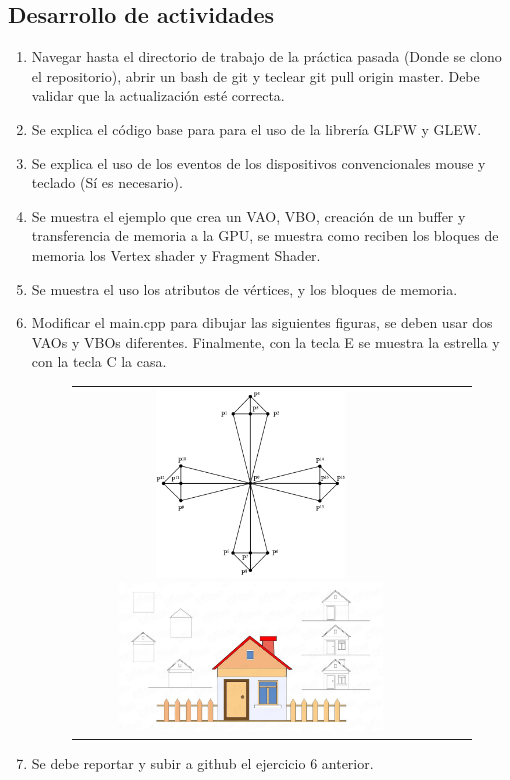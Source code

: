 \documentclass[11pt, english]{article}
\begin{document}
\subsection{Desarrollo de actividades}
\begin{enumerate}
\item Navegar hasta el directorio de trabajo de la práctica pasada (Donde se clono el
repositorio), abrir un bash de git y teclear git pull origin master. Debe validar que
la actualización esté correcta.
\item Se explica el código base para para el uso de la librería GLFW y GLEW.
\item Se explica el uso de los eventos de los dispositivos convencionales mouse y
teclado (Sí es necesario).
\item Se muestra el ejemplo que crea un VAO, VBO, creación de un buffer y
transferencia de memoria a la GPU, se muestra como reciben los bloques de
memoria los Vertex shader y Fragment Shader.
\item Se muestra el uso los atributos de vértices, y los bloques de memoria.
\item Modificar el main.cpp para dibujar las siguientes
figuras, se deben usar dos VAOs y VBOs diferentes. Finalmente, con la tecla E
se muestra la estrella y con la tecla C la casa.
\begin{figure}[htb]
\begin{center}
\centering
\begin{tabular}{@{}cccc@{}}
\includegraphics[width=5cm]{images/Estrella.png}
\hspace*{0.3in}
\includegraphics[width=7cm]{images/Casa.png}
\end{tabular}
\end{center}
\end{figure}
\item Se debe reportar y subir a github el ejercicio 6 anterior.
\end{enumerate}
\end{document}
